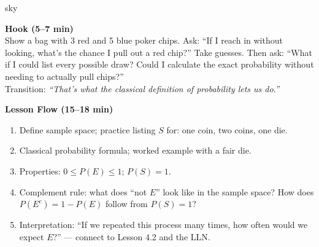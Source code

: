 \documentclass[10pt]{article}
\begin{document}
\begin{skillbox}{sky}
\begin{minipage}[t]{0.48\linewidth}
    \textbf{Hook (5--7 min)}\\
    Show a bag with 3 red and 5 blue poker chips. Ask: ``If I reach in without looking,
    what's the chance I pull out a red chip?'' Take guesses. Then ask:
    ``What if I could list every possible draw? Could I calculate the exact probability
    without needing to actually pull chips?''\\
    Transition: \textit{``That's what the classical definition of probability lets us do.''}
\end{minipage}
\hfill
\begin{minipage}[t]{0.48\linewidth}
    \textbf{Lesson Flow (15--18 min)}
    \begin{enumerate}
        \item Define sample space; practice listing $S$ for: one coin, two coins, one die.
        \item Classical probability formula; worked example with a fair die.
        \item Properties: $0 \le P(E) \le 1$; $P(S) = 1$.
        \item Complement rule: what does ``not $E$'' look like in the sample space? How does
              $P(E^c) = 1 - P(E)$ follow from $P(S) = 1$?
        \item Interpretation: ``If we repeated this process many times, how often
              would we expect $E$?'' --- connect to Lesson 4.2 and the LLN.
    \end{enumerate}
\end{minipage}
\end{skillbox}
\end{document}
